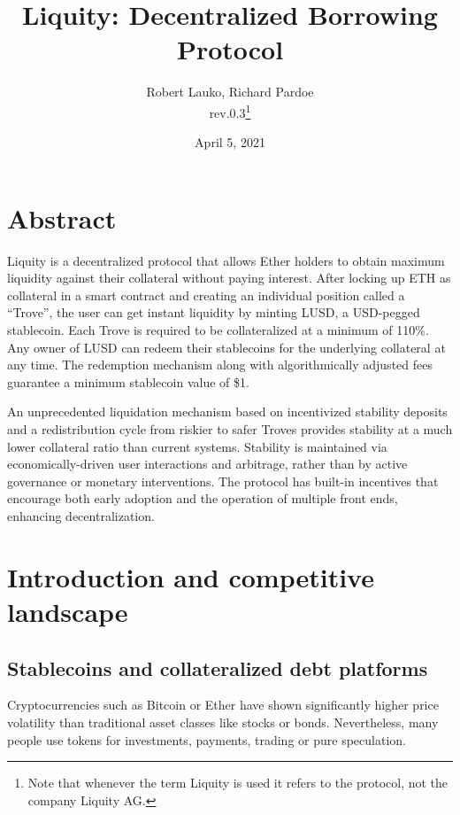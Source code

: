 \documentclass{article}
\begin{document}
\title{\textbf{Liquity: Decentralized Borrowing Protocol}}
\author{Robert Lauko, Richard Pardoe \\ rev.0.3\footnote{Note that whenever the term Liquity is used it refers to the protocol, not the company Liquity AG.}}
\date{April 5, 2021}

\maketitle

\section*{Abstract}
Liquity is a decentralized protocol that allows Ether holders to obtain maximum liquidity against their collateral without paying interest. After locking up ETH as collateral in a smart contract and creating an individual position called a “Trove”, the user can get instant liquidity by minting LUSD, a USD-pegged stablecoin. Each Trove is required to be collateralized at a minimum of 110\%. Any owner of LUSD can redeem their stablecoins for the underlying collateral at any time. The redemption mechanism along with algorithmically adjusted fees guarantee a minimum stablecoin value of \$1. 

An unprecedented liquidation mechanism based on incentivized stability deposits and a redistribution cycle from riskier to safer Troves provides stability at a much lower collateral ratio than current systems. Stability is maintained via economically-driven user interactions and arbitrage, rather than by active governance or monetary interventions. 
The protocol has built-in incentives that encourage both early adoption and the operation of multiple front ends, enhancing decentralization.

\newpage

\tableofcontents

\section{Introduction and competitive landscape}

\subsection{Stablecoins and collateralized debt platforms}
Cryptocurrencies such as Bitcoin or Ether have shown significantly higher price volatility than traditional asset classes like stocks or bonds. Nevertheless, many people use tokens for investments, payments, trading or pure speculation.
\end{document}

